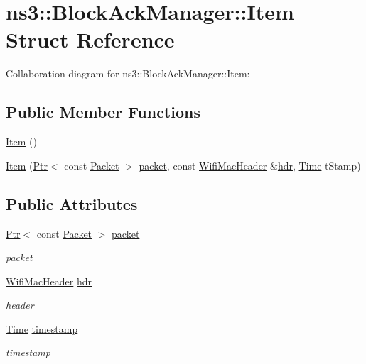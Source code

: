 \hypertarget{structns3_1_1BlockAckManager_1_1Item}{}\section{ns3\+:\+:Block\+Ack\+Manager\+:\+:Item Struct Reference}
\label{structns3_1_1BlockAckManager_1_1Item}


Collaboration diagram for ns3\+:\+:Block\+Ack\+Manager\+:\+:Item\+:
\subsection*{Public Member Functions}
\begin{DoxyCompactItemize}
\item 
\hyperlink{structns3_1_1BlockAckManager_1_1Item_abcc7092268a2b26f25d8efe8adaac9d9}{Item} ()
\item 
\hyperlink{structns3_1_1BlockAckManager_1_1Item_a6ab852d13a721c7ea455cc7510eb81c3}{Item} (\hyperlink{classns3_1_1Ptr}{Ptr}$<$ const \hyperlink{classns3_1_1Packet}{Packet} $>$ \hyperlink{structns3_1_1BlockAckManager_1_1Item_a7f8db82e6b4cf7f45b17083e4dc1714a}{packet}, const \hyperlink{classns3_1_1WifiMacHeader}{Wifi\+Mac\+Header} \&\hyperlink{structns3_1_1BlockAckManager_1_1Item_a46376db3aeec2a0776705d6587448a2a}{hdr}, \hyperlink{classns3_1_1Time}{Time} t\+Stamp)
\end{DoxyCompactItemize}
\subsection*{Public Attributes}
\begin{DoxyCompactItemize}
\item 
\hyperlink{classns3_1_1Ptr}{Ptr}$<$ const \hyperlink{classns3_1_1Packet}{Packet} $>$ \hyperlink{structns3_1_1BlockAckManager_1_1Item_a7f8db82e6b4cf7f45b17083e4dc1714a}{packet}
\begin{DoxyCompactList}\small\item\em packet \end{DoxyCompactList}\item 
\hyperlink{classns3_1_1WifiMacHeader}{Wifi\+Mac\+Header} \hyperlink{structns3_1_1BlockAckManager_1_1Item_a46376db3aeec2a0776705d6587448a2a}{hdr}
\begin{DoxyCompactList}\small\item\em header \end{DoxyCompactList}\item 
\hyperlink{classns3_1_1Time}{Time} \hyperlink{structns3_1_1BlockAckManager_1_1Item_a07d95bde0158a3f6084b989ddbc2c150}{timestamp}
\begin{DoxyCompactList}\small\item\em timestamp \end{DoxyCompactList}\end{DoxyCompactItemize}



